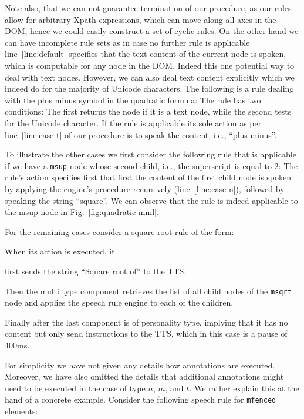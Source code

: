 \documentclass{sig-alternate}
\begin{document}
Note also, that we can not guarantee termination of our procedure, as our rules
allow for arbitrary Xpath expressions, which can move along all axes in the DOM,
hence we could easily construct a set of cyclic rules. On the other hand we can
have incomplete rule sets as in case no further rule is applicable
line~\ref{line:default} specifies that the text content of the current node is
spoken, which is computable for any node in the DOM. Indeed this one potential
way to deal with text nodes. However, we can also deal text content explicitly
which we indeed do for the majority of Unicode characters.  The following is a
rule dealing with the plus minus symbol in the quadratic formula:
 The rule has two
conditions: The first returns the node if it is a text node, while the second
tests for the Unicode character. If the rule is applicable its sole action as
per line~\ref{line:case-t} of our procedure is to speak the content, i.e.,
``plus minus''.

To illustrate the other cases we first consider the following rule that is
applicable if we have a \texttt{msup} node whose second child, i.e., the superscript is
equal to $2$:  The rule's action specifies first that first the content of the
first child node is spoken by applying the engine's procedure recursively
(line~\ref{line:case-n}), followed by speaking the string ``square''.  We can
observe that the rule is indeed applicable to the msup node in
Fig.~\ref{fig:quadratic-mml}.

For the remaining cases  consider a square root rule of the form:

When its action is executed, it
\begin{inparaenum}[(1)]
\item first sends the string ``Square root of'' to the TTS.
\item Then the multi type component retrieves the list of all child nodes of the
  \texttt{msqrt} node and applies the speech rule engine to each of the children.
\item Finally after the last component is of personality type, implying that it
  has no content but only send instructions to the TTS, which in this case is a
  pause of 400ms.
\end{inparaenum}

For simplicity we have not given any details how annotations are executed.
Moreover, we have also omitted the details that additional annotations might
need to be executed in the case of type $n$, $m$, and $t$. We rather explain
this at the hand of a concrete example. Consider the following speech rule for
\texttt{mfenced} elements:
\end{document}
